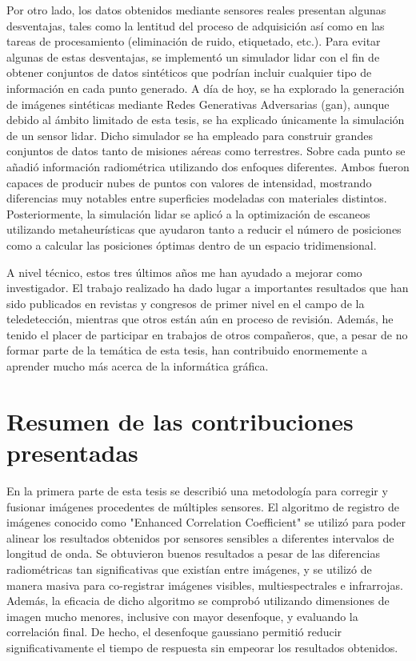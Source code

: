 Por otro lado, los datos obtenidos mediante sensores reales presentan algunas desventajas, tales como la lentitud del proceso de adquisición así como en las tareas de procesamiento (eliminación de ruido, etiquetado, etc.). Para evitar algunas de estas desventajas, se implementó un simulador \acrshort{lidar} con el fin de obtener conjuntos de datos sintéticos que podrían incluir cualquier tipo de información en cada punto generado. A día de hoy, se ha explorado la generación de imágenes sintéticas mediante Redes Generativas Adversarias (\acrshort{gan}), aunque debido al ámbito limitado de esta tesis, se ha explicado únicamente la simulación de un sensor \acrshort{lidar}.  Dicho simulador se ha empleado para construir grandes conjuntos de datos tanto de misiones aéreas como terrestres. Sobre cada punto se añadió información radiométrica utilizando dos enfoques diferentes. Ambos fueron capaces de producir nubes de puntos con valores de intensidad, mostrando diferencias muy notables entre superficies modeladas con materiales distintos. Posteriormente, la simulación \acrshort{lidar} se aplicó a la optimización de escaneos utilizando metaheurísticas que ayudaron tanto a reducir el número de posiciones como a calcular las posiciones óptimas dentro de un espacio tridimensional.

A nivel técnico, estos tres últimos años me han ayudado a mejorar como investigador. El trabajo realizado ha dado lugar a importantes resultados que han sido publicados en revistas y congresos de primer nivel en el campo de la teledetección, mientras que otros están aún en proceso de revisión. Además, he tenido el placer de participar en trabajos de otros compañeros, que, a pesar de no formar parte de la temática de esta tesis, han contribuido enormemente a aprender mucho más acerca de la informática gráfica.

\section{Resumen de las contribuciones presentadas}

En la primera parte de esta tesis se describió una metodología para corregir y fusionar imágenes procedentes de múltiples sensores. El algoritmo de registro de imágenes conocido como "Enhanced Correlation Coefficient" se utilizó para poder alinear los resultados obtenidos por sensores sensibles a diferentes intervalos de longitud de onda. Se obtuvieron buenos resultados a pesar de las diferencias radiométricas tan significativas que existían entre imágenes, y se utilizó de manera masiva para co-registrar imágenes visibles, multiespectrales e infrarrojas. Además, la eficacia de dicho algoritmo se comprobó utilizando dimensiones de imagen mucho menores, inclusive con mayor desenfoque, y evaluando la correlación final. De hecho, el desenfoque gaussiano permitió reducir significativamente el tiempo de respuesta sin empeorar los resultados obtenidos.

